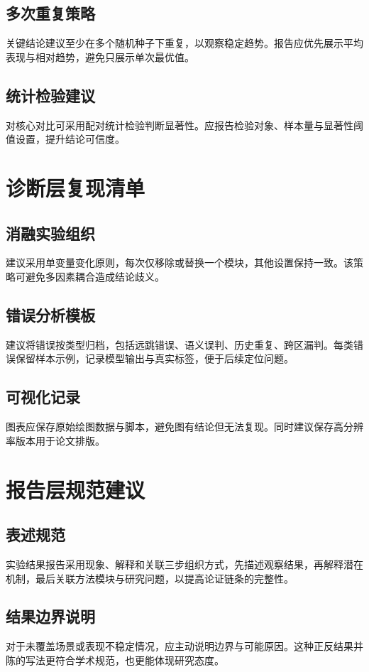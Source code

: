 \subsection{多次重复策略}
关键结论建议至少在多个随机种子下重复，以观察稳定趋势。报告应优先展示平均表现与相对趋势，避免只展示单次最优值。

\subsection{统计检验建议}
对核心对比可采用配对统计检验判断显著性。应报告检验对象、样本量与显著性阈值设置，提升结论可信度。

\section{诊断层复现清单}
\subsection{消融实验组织}
建议采用单变量变化原则，每次仅移除或替换一个模块，其他设置保持一致。该策略可避免多因素耦合造成结论歧义。

\subsection{错误分析模板}
建议将错误按类型归档，包括远跳错误、语义误判、历史重复、跨区漏判。每类错误保留样本示例，记录模型输出与真实标签，便于后续定位问题。

\subsection{可视化记录}
图表应保存原始绘图数据与脚本，避免图有结论但无法复现。同时建议保存高分辨率版本用于论文排版。

\section{报告层规范建议}
\subsection{表述规范}
实验结果报告采用现象、解释和关联三步组织方式，先描述观察结果，再解释潜在机制，最后关联方法模块与研究问题，以提高论证链条的完整性。

\subsection{结果边界说明}
对于未覆盖场景或表现不稳定情况，应主动说明边界与可能原因。这种正反结果并陈的写法更符合学术规范，也更能体现研究态度。

